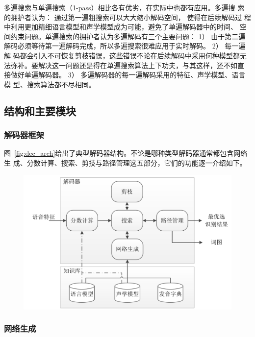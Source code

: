 多遍搜索与单遍搜索（1-pass）相比各有优劣，在实际中也都有应用。多遍搜
索的拥护者认为： 通过第一遍粗搜索可以大大缩小解码空间， 使得在后续解码过
程中利用更加精细语言模型和声学模型成为可能，避免了单遍解码器中的时间、
空间约束问题。单遍搜索的拥护者认为多遍解码有三个主要问题： 1） 由于第二遍
解码必须等待第一遍解码完成，所以多遍搜索很难应用于实时解码。 2） 每一遍解
码都会引入不可恢复剪枝错误，这些错误不论在后续解码中采用何种模型都无
法弥补。要解决这一问题还是得在单遍搜索算法上下功夫，与其这样，还不如直
接做好单遍解码器。 3） 多遍解码器的每一遍解码采用的特征、声学模型、语言模
型、搜索算法都不尽相同。

\subsection{结构和主要模块}
\label{chap:intro-lvcsr-decmodule}

\subsubsection{解码器框架}

图~\ref{fig:dec_arch}给出了典型解码器结构。不论是哪种类型解码器通常都包含网络生
成、分数计算、搜索、剪技与路径管理这五部分，它们的功能逐一介绍如下。

\begin{figure}[!htp]
  \centering
    \captionstyle{\centering}
    \includegraphics[clip=true, width=.9\textwidth]{figure/dec_arch.png}
\end{figure}


\subsubsection{网络生成}

